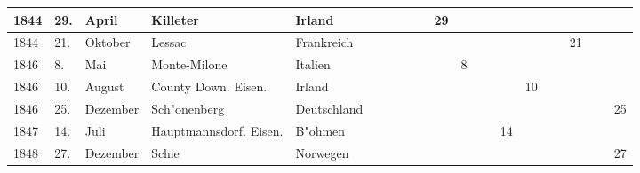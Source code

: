 \documentclass[a4paper, 8pt, oneside, polutonikogreek, german]{article}
\begin{document}
\begin{landscape}
\begin{table}[H]
\begin{longtable}{|p{5mm}|p{4mm}|p{13mm}|p{23mm}|p{16mm}|p{4mm}|p{6mm}|p{6mm}|p{6mm}|p{4mm}|p{5mm}|p{4mm}|p{5mm}|p{6mm}|p{5mm}|p{5mm}|p{5mm}|}
        1844 & 29. & April & Killeter & Irland & ~ & ~ & ~ & 29 & ~ & ~ & ~ & ~ & ~ & ~ & ~ & ~ \\ \hline
        1844 & 21. & Oktober & Lessac & Frankreich & ~ & ~ & ~ & ~ & ~ & ~ & ~ & ~ & ~ & 21 & ~ & ~ \\ \hline
        1846 & 8. & Mai & Monte-Milone & Italien & ~ & ~ & ~ & ~ & 8 & ~ & ~ & ~ & ~ & ~ & ~ & ~ \\ \hline
        1846 & 10. & August & County Down. Eisen. & Irland & ~ & ~ & ~ & ~ & ~ & ~ & ~ & 10 & ~ & ~ & ~ & ~ \\ \hline
        1846 & 25. & Dezember & Sch"onenberg & Deutschland & ~ & ~ & ~ & ~ & ~ & ~ & ~ & ~ & ~ & ~ & ~ & 25 \\ \hline
        1847 & 14. & Juli & Hauptmannsdorf. Eisen. & B"ohmen & ~ & ~ & ~ & ~ & ~ & ~ & 14 & ~ & ~ & ~ & ~ & ~ \\ \hline
        1848 & 27. & Dezember & Schie & Norwegen & ~ & ~ & ~ & ~ & ~ & ~ & ~ & ~ & ~ & ~ & ~ & 27 \\ \hline
    \end{longtable}
\end{table}
\end{landscape}
\clearpage
\end{document}
